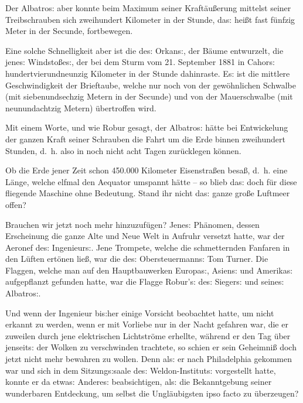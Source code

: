 \documentclass[oneside,12pt]{book}
\newenvironment{antiqua}{\normalfont}{}
\newcommand{\s}{s:}
\begin{document}
Der {\glqq}Albatro{\s}{\grqq} aber konnte beim Maximum seiner
Kraft\"au{\ss}erung mittelst seiner Treibschrauben sich zweihundert
Kilometer in der Stunde, da{\s} hei{\ss}t fast f\"unfzig Meter in der
Secunde, fortbewegen.

Eine solche Schnelligkeit aber ist die de{\s} Orkan{\s}, der B\"aume
entwurzelt, die jene{\s} Windsto{\ss}e{\s}, der bei dem Sturm vom 21.
September 1881 in Cahor{\s} hundertvierundneunzig Kilometer in der
Stunde dahinraste. E{\s} ist die mittlere Geschwindigkeit der
Brieftaube, welche nur noch von der gew\"ohnlichen Schwalbe (mit
siebenundsechzig Metern in der Secunde) und von der Mauerschwalbe
(mit neunundacht\/zig Metern) \"ubertroffen wird.

Mit einem Worte, und wie Robur gesagt, der {\glqq}Albatro{\s}{\grqq}
h\"atte bei Entwickelung der ganzen Kraft seiner Schrauben die Fahrt
um die Erde binnen zweihundert Stunden, d.~h. also in noch nicht acht
Tagen zur\"ucklegen k\"onnen.

Ob die Erde jener Zeit schon 450.000 Kilometer Eisenstra{\ss}en
besa{\ss}, d.~h. eine L\"ange, welche elfmal den Aequator umspannt
h\"atte -- so blieb da{\s} doch f\"ur diese fliegende Maschine ohne
Bedeutung. Stand ihr nicht da{\s} ganze gro{\ss}e Luftmeer offen?

Brauchen wir jetzt noch mehr hinzuzuf\"ugen? Jene{\s} Ph\"anomen,
dessen Erscheinung die ganze Alte und Neue Welt in Aufruhr versetzt
hatte, war der Aeronef de{\s} Ingenieur{\s}. Jene Trompete, welche
die schmetternden Fanfaren in den L\"uften ert\"onen lie{\ss}, war
die de{\s} Obersteuermann{\s} Tom Turner. Die Flaggen, welche man auf
den Hauptbauwerken Europa{\s}, Asien{\s} und Amerika{\s} aufgepflanzt
gefunden hatte, war die Flagge Robur'{\s} de{\s} Sieger{\s} und
seine{\s} {\glqq}Albatro{\s}{\grqq}.

Und wenn der Ingenieur bi{\s}her einige Vorsicht beobachtet hatte, um
nicht erkannt zu werden, wenn er mit Vorliebe nur in der Nacht
gefahren war, die er zuweilen durch jene elektrischen Lichtstr\"ome
erhellte, w\"ahrend er den Tag \"uber jenseit{\s} der Wolken zu
verschwinden trachtete, so schien er sein Geheimni{\ss} doch jetzt
nicht mehr bewahren zu wollen. Denn al{\s} er nach Philadelphia
gekommen war und sich in dem Sitzung{\s}saale de{\s}
Weldon-Institut{\s} vorgestellt hatte, konnte er da etwa{\s}
Andere{\s} beabsichtigen, al{\s} die Bekanntgebung seiner wunderbaren
Entdeckung, um selbst die Ungl\"aubigsten \begin{antiqua}ipso
facto\end{antiqua} zu \"uberzeugen?
\end{document}
